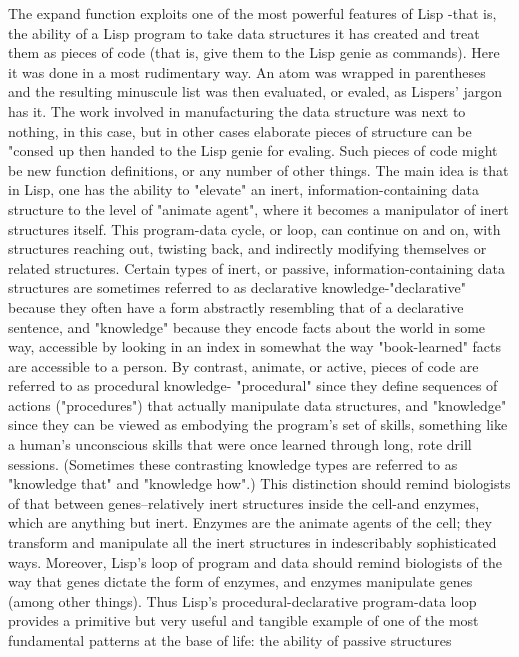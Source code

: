 The expand function exploits one of the most powerful features of Lisp -that is, the
ability of a Lisp program to take data structures it has created and treat them as pieces
of code (that is, give them to the Lisp genie as commands). Here it was done in a most
rudimentary way. An atom was wrapped in parentheses and the resulting minuscule
list was then evaluated, or evaled, as Lispers' jargon has it. The work involved in
manufacturing the data structure was next to nothing, in this case, but in other cases
elaborate pieces of structure can be "consed up then handed to the Lisp genie for
evaling. Such pieces of code might be new function definitions, or any number of
other things. The main idea is that in Lisp, one has the ability to "elevate" an inert,
information-containing data structure to the level of "animate agent", where it
becomes a manipulator of inert structures itself. This program-data cycle, or loop, can
continue on and on, with structures reaching out, twisting back, and indirectly
modifying themselves or related structures.
        Certain types of inert, or passive, information-containing data structures are
sometimes referred to as declarative knowledge-"declarative" because they often have
a form abstractly resembling that of a declarative sentence, and "knowledge" because
they encode facts about the world in some way, accessible by looking in an index in
somewhat the way "book-learned" facts are accessible to a person. By contrast,
animate, or active, pieces of code are referred to as procedural knowledge-
"procedural" since they define sequences of actions ("procedures") that actually
manipulate data structures, and "knowledge" since they can be viewed as embodying
the program's set of skills, something like a human's unconscious skills that were once
learned through long, rote drill sessions. (Sometimes these contrasting knowledge
types are referred to as "knowledge that" and "knowledge how".)
        This distinction should remind biologists of that between genes--relatively
inert structures inside the cell-and enzymes, which are anything but inert. Enzymes
are the animate agents of the cell; they transform and manipulate all the inert
structures in indescribably sophisticated ways. Moreover, Lisp's loop of program and
data should remind biologists of the way that genes dictate the form of enzymes, and
enzymes manipulate genes (among other things). Thus Lisp's procedural-declarative
program-data loop provides a primitive but very useful and tangible example of one
of the most fundamental patterns at the base of life: the ability of passive structures




